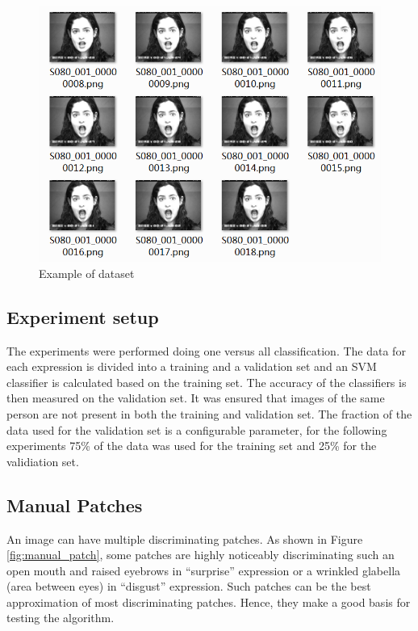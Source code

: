 \begin{figure}[h!]
\centering
\includegraphics[scale=0.55]{img/example.png}
\caption{Example of dataset}
\label{Example of dataset}
\end{figure}

\subsection{Experiment setup}
The experiments were performed doing one versus all classification. The data for each expression is divided into a training and a validation set and an SVM
classifier is calculated based on the training set. The accuracy of the classifiers is then measured on the validation set. It was ensured that images of the same
person are not present in both the training and validation set. The fraction of the data used for the validation set is a configurable parameter, for the 
following experiments 75\% of the data was used for the training set and 25\% for the validiation set. 

\subsection{Manual Patches}

An image can have multiple discriminating patches. As shown in Figure \ref{fig:manual_patch}, some patches are highly noticeably discriminating such an open mouth and raised eyebrows in "`surprise"' expression or a wrinkled glabella (area between eyes) in "`disgust"' expression. Such patches can be the best approximation of most discriminating patches. Hence, they make a good basis for testing the algorithm. 

